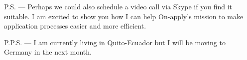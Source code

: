 \documentclass[11pt, a4paper]{awesome-cv}
\begin{document}
\makeletterclosing

P.S. — Perhaps we could also schedule a video call via Skype if you find it suitable. I am excited to show you how I can help On-apply's mission to make application processes easier and more efficient.

P.P.S. —  I am currently living in Quito-Ecuador but I will be moving to Germany in the next month.
\end{document}
